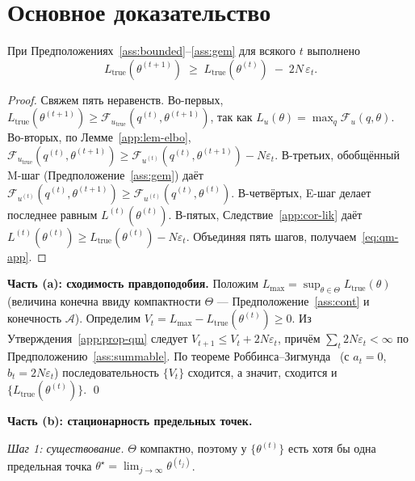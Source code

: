 \section{Основное доказательство}
\label{app:mainproof}

\begin{proposition}
\label{app:prop-qm}
При Предположениях~\ref{ass:bounded}--\ref{ass:gem} для всякого $t$
выполнено
\begin{equation}
\label{eq:qm-app}
L_{\mathrm{true}}(\theta^{(t+1)}) \;\geq\;
L_{\mathrm{true}}(\theta^{(t)}) \;-\; 2N\,\varepsilon_t.
\end{equation}
\end{proposition}

\begin{proof}
Свяжем пять неравенств. Во-первых,
$L_{\mathrm{true}}(\theta^{(t+1)}) \geq
\mathcal{F}_{u_{\mathrm{true}}}(q^{(t)}, \theta^{(t+1)})$, так как
$L_u(\theta) = \max_q \mathcal{F}_u(q,\theta)$. Во-вторых, по
Лемме~\ref{app:lem-elbo},
$\mathcal{F}_{u_{\mathrm{true}}}(q^{(t)}, \theta^{(t+1)})
\geq \mathcal{F}_{u^{(t)}}(q^{(t)}, \theta^{(t+1)}) - N\varepsilon_t$.
В-третьих, обобщённый M-шаг (Предположение~\ref{ass:gem}) даёт
$\mathcal{F}_{u^{(t)}}(q^{(t)}, \theta^{(t+1)})
\geq \mathcal{F}_{u^{(t)}}(q^{(t)}, \theta^{(t)})$. В-четвёртых, E-шаг
делает последнее равным $L^{(t)}(\theta^{(t)})$. В-пятых,
Следствие~\ref{app:cor-lik} даёт
$L^{(t)}(\theta^{(t)}) \geq L_{\mathrm{true}}(\theta^{(t)}) - N\varepsilon_t$.
Объединяя пять шагов, получаем~\eqref{eq:qm-app}.
\end{proof}

\textbf{Часть (a): сходимость правдоподобия.} Положим
$L_{\max} = \sup_{\theta\in\Theta} L_{\mathrm{true}}(\theta)$ (величина
конечна ввиду компактности $\Theta$ --- Предположение~\ref{ass:cont} и
конечность $\mathcal{A}$). Определим
$V_t = L_{\max} - L_{\mathrm{true}}(\theta^{(t)}) \geq 0$. Из
Утверждения~\ref{app:prop-qm} следует
$V_{t+1} \leq V_t + 2N\varepsilon_t$, причём
$\sum_{t} 2N\varepsilon_t < \infty$ по Предположению~\ref{ass:summable}.
По теореме Роббинса--Зигмунда~\cite{robbins1971convergence} (с $a_t = 0$,
$b_t = 2N\varepsilon_t$) последовательность $\{V_t\}$ сходится, а значит,
сходится и $\{L_{\mathrm{true}}(\theta^{(t)})\}$. \qed

\textbf{Часть (b): стационарность предельных точек.}

\emph{Шаг 1: существование.} $\Theta$ компактно, поэтому у
$\{\theta^{(t)}\}$ есть хотя бы одна предельная точка
$\theta^{\star} = \lim_{j\to\infty} \theta^{(t_j)}$.

